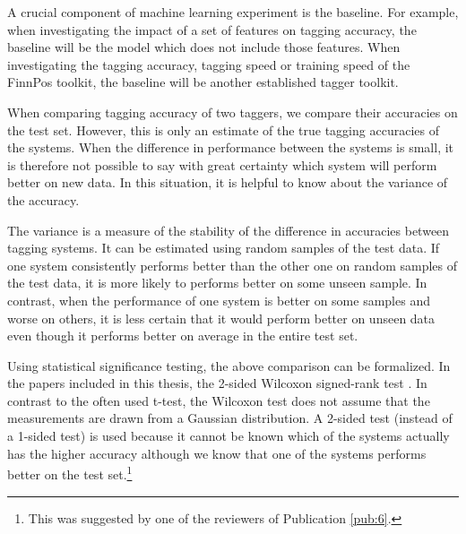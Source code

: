 A crucial component of machine learning experiment is the
baseline. For example, when investigating the impact of a set of
features on tagging accuracy, the baseline will be the model which
does not include those features. When investigating the tagging
accuracy, tagging speed or training speed of the FinnPos toolkit, the
baseline will be another established tagger toolkit.

When comparing tagging accuracy of two taggers, we compare their
accuracies on the test set. However, this is only an estimate of the
true tagging accuracies of the systems. When the difference in
performance between the systems is small, it is therefore not possible
to say with great certainty which system will perform better on new
data. In this situation, it is helpful to know about the variance of
the accuracy. 

The variance is a measure of the stability of the difference in
accuracies between tagging systems. It can be estimated using random
samples of the test data. If one system consistently performs better
than the other one on random samples of the test data, it is more
likely to performs better on some unseen sample. In contrast, when the
performance of one system is better on some samples and worse on
others, it is less certain that it would perform better on unseen data
even though it performs better on average in the entire test set.

Using statistical significance testing, the above comparison can be
formalized. In the papers included in this thesis, the 2-sided
Wilcoxon signed-rank test \citep{Wilcoxon45}. In contrast to the often
used t-test, the Wilcoxon test does not assume that the measurements
are drawn from a Gaussian distribution. A 2-sided test (instead of a
1-sided test) is used because it cannot be known which of the systems
actually has the higher accuracy although we know that one of the
systems performs better on the test set.\footnote{This was suggested
  by one of the reviewers of Publication \ref{pub:6}.}


